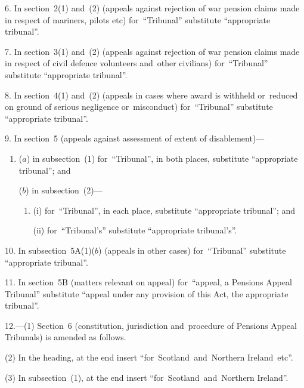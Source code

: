 \documentclass[12pt,a4paper]{article}
\begin{document}
\medskip

6.  In section~2(1) and~(2) (appeals against rejection of war pension claims made in respect of mariners, pilots etc) for~“Tribunal” substitute “appropriate tribunal”.

\medskip

7.  In section~3(1) and~(2) (appeals against rejection of war pension claims made in respect of civil defence volunteers and~other civilians) for~“Tribunal” substitute “appropriate tribunal”.

\medskip

8.  In section~4(1) and~(2) (appeals in cases where award is withheld or~reduced on ground of serious negligence or~misconduct) for~“Tribunal” substitute “appropriate tribunal”.

\medskip

9.  In section~5 (appeals against assessment of extent of disablement)—
\begin{enumerate}\item[]
($a$) in subsection~(1) for~“Tribunal”, in both places, substitute “appropriate tribunal”; and

($b$) in subsection~(2)—
\begin{enumerate}\item[]
(i) for~“Tribunal”, in each place, substitute “appropriate tribunal”; and

(ii) for~“Tribunal’s” substitute “appropriate tribunal’s”.
\end{enumerate}
\end{enumerate}

\medskip

10.  In subsection~5A(1)($b$)  (appeals in other cases) for~“Tribunal” substitute “appropriate tribunal”.

\medskip

11.  In section~5B (matters relevant on appeal) for~“appeal, a Pensions Appeal Tribunal” substitute “appeal under any provision of this Act, the appropriate tribunal”.

\medskip

12.---(1)  Section~6 (constitution, jurisdiction and~procedure of Pensions Appeal Tribunals) is amended as follows.

(2) In the heading, at the end insert “for~Scotland~and~Northern Ireland~etc”.

(3) In subsection~(1), at the end insert “for~Scotland~and~Northern Ireland”.
\end{document}

